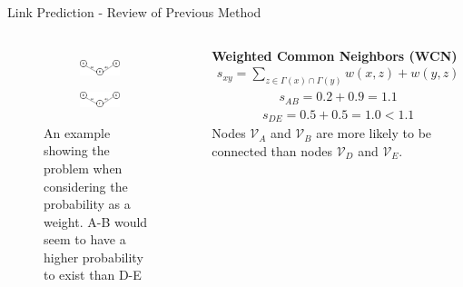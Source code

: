 \documentclass[9pt]{beamer}
\begin{document}
\begin{frame}{Link Prediction - Review of Previous Method}
  \begin{columns}[T,onlytextwidth]
      \begin{figure}
      \centering
      
      \begin{subfigure}[b]{\textwidth}
         \includegraphics[scale = 0.25]{common_neighbor_2.png}
      \end{subfigure}

      \begin{subfigure}[b]{\textwidth}
         \includegraphics[scale = 0.25]{common_neighbor_1.png}
      \end{subfigure}

      \caption{An example showing the problem when considering the probability as a weight. A-B would seem to have a higher probability to exist than D-E}
      \label{example}
      \end{figure}

    \textbf{Weighted Common Neighbors (WCN)}
    \begin{align*}
    s_{xy}=\sum_{z\in \Gamma(x)\cap\Gamma(y)}w(x,z)+w(y,z)
    \end{align*}
      \begin{align*}
      s_{AB} =0.2 + 0.9 = 1.1
      \end{align*}
      \begin{align*}
      s_{DE} =0.5 + 0.5 = 1.0 < 1.1
      \end{align*}
      \newline
      \newline
	Nodes $\mathcal{V}_A$ and $\mathcal{V}_B$ are more likely to be connected than nodes $\mathcal{V}_D$ and $\mathcal{V}_E$.
  \end{columns}
\end{frame}
\end{document}
